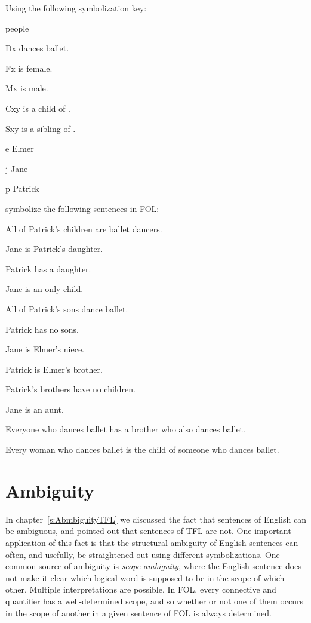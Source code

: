 \solutions
\problempart
\label{pr.FOLballet}
Using the following symbolization key:
\begin{ekey}
\item[\text{domain}] people
\item[Dx]  dances ballet.
\item[Fx]  is female.
\item[Mx]  is male.
\item[Cxy]  is a child of .
\item[Sxy]  is a sibling of .
\item[e] Elmer
\item[j] Jane
\item[p] Patrick
\end{ekey}
symbolize the following sentences in FOL:
\begin{earg}
\item All of Patrick's children are ballet dancers.
\item Jane is Patrick's daughter.
\item Patrick has a daughter.
\item Jane is an only child.
\item All of Patrick's sons dance ballet.
\item Patrick has no sons.
\item Jane is Elmer's niece.
\item Patrick is Elmer's brother.
\item Patrick's brothers have no children.
\item Jane is an aunt.
\item Everyone who dances ballet has a brother who also dances ballet.
\item Every woman who dances ballet is the child of someone who dances ballet.
\end{earg}






\chapter{Ambiguity}

In chapter~\ref{s:AbmbiguityTFL} we discussed the fact that sentences of English can be ambiguous, and pointed out that sentences of TFL are not. One important application of this fact is that the structural ambiguity of English sentences can often, and usefully, be straightened out using different symbolizations.  One common source of ambiguity is \emph{scope ambiguity}, where the English sentence does not make it clear which logical word is supposed to be in the scope of which other. Multiple interpretations are possible.  In FOL, every connective and quantifier has a well-determined scope, and so whether or not one of them occurs in the scope of another in a given sentence of FOL is always determined.

